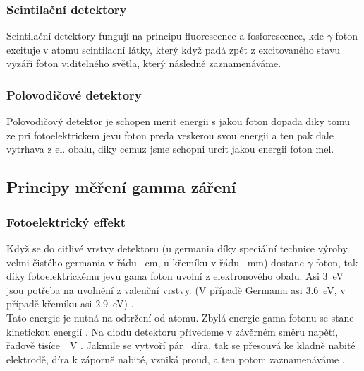 \subsubsection{Scintilační detektory}
Scintilační detektory fungují na principu fluorescence a fosforescence, kde $\gamma$ foton excituje \e v atomu scintilacní látky, který když padá zpět z excitovaného stavu vyzáří foton viditelného světla, který následně zaznamenáváme.\cite{Knoll2010, Scintilators}
\subsubsection{Polovodičové detektory}
Polovodičový detektor je schopen merit energii s jakou foton dopada diky tomu ze pri fotoelektrickem jevu foton preda veskerou svou energii \e a ten pak dale vytrhava \e z el. obalu, diky cemuz jsme schopni urcit jakou energii foton mel. %

\subsection{Principy měření gamma záření}%
\subsubsection{Fotoelektrický effekt}
Když se do citlivé vrstvy detektoru (u germania díky speciální technice výroby velmi čistého germania v řádu \SI{}{\centi\meter}, u křemíku v řádu \SI{}{\milli\meter})  \cite{Knoll2010} %
dostane $\gamma$ foton, tak díky fotoelektrickému jevu gama foton uvolní \e z elektronového obalu. Asi \SI{3}{\electronvolt} jsou potřeba na uvolnění \e z valenční vrstvy. (V případě Germania asi \SI{3,6}{\electronvolt}, v případě křemíku asi \SI{2,9}{\electronvolt}) \cite{astrnukleofyzika, nuclear_power-hpge}.\\ %
Tato energie je nutná na odtržení \e od atomu. Zbylá energie gama fotonu se stane kinetickou energií \e.  \cite{semiconductors} %
Na diodu detektoru přivedeme v závěrném směru napětí, řadově tisíce~\SI{}{\volt} \cite{hpge-detector_fabrication}. %
Jakmile se vytvoří pár \e~díra, tak se \e  přesouvá ke kladně nabité elektrodě, díra k záporně nabité, vzniká proud, a ten potom zaznamenáváme \cite{VUT,Knoll2010}. 
